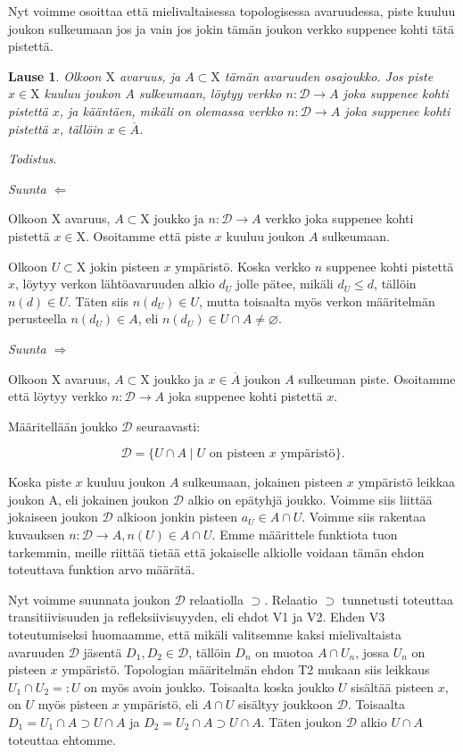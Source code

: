 \documentclass[12pt,a4paper,leqno]{report}
\newcommand{\X}{\mathrm{X}}
\newcommand{\D}{\mathcal{D}}
\newcommand{\verkop}{\leq}
\theoremstyle{plain}
\newtheorem{lause}[equation]{Lause}
\theoremstyle{definition}
\theoremstyle{remark}
\begin{document}
Nyt voimme osoittaa että mielivaltaisessa topologisessa avaruudessa, piste kuuluu joukon sulkeumaan jos ja vain jos jokin tämän joukon verkko suppenee kohti tätä pistettä.

\begin{lause}\label{verksulklause}
Olkoon $\X$ avaruus, ja $A \subset \X$ tämän avaruuden osajoukko. Jos piste $x \in \X$ kuuluu joukon $A$ sulkeumaan, löytyy verkko $n : \D \to A$ joka suppenee kohti pistettä $x$, ja kääntäen, mikäli on olemassa verkko $n : \D \to A$ joka suppenee kohti pistettä $x$, tällöin $x \in \overline{A}$.
\end{lause}

\noindent\emph{Todistus}.

\emph{Suunta $\Leftarrow$}

Olkoon $\X$ avaruus, $A \subset \X$ joukko ja $n : \D \to A$ verkko joka suppenee kohti pistettä $x \in \X$. Osoitamme että piste $x$ kuuluu joukon $A$ sulkeumaan.

Olkoon $U \subset \X$ jokin pisteen $x$ ympäristö. Koska verkko $n$ suppenee kohti pistettä $x$, löytyy verkon lähtöavaruuden alkio $d_U$ jolle pätee, mikäli $d_U \verkop d$, tällöin $n(d) \in U$. Täten siis $n(d_U) \in U$, mutta toisaalta myös verkon määritelmän perusteella $n(d_U) \in A$, eli $n(d_U) \in U \cap A \not= \varnothing$.

\emph{Suunta $\Rightarrow$}

Olkoon $\X$ avaruus, $A \subset \X$ joukko ja $x \in \overline{A}$ joukon $A$ sulkeuman piste. Osoitamme että löytyy verkko $n : \D \to A$ joka suppenee kohti pistettä $x$.

Määritellään joukko $\D$ seuraavasti:

\begin{equation}
\D = \{U \cap A \mid U \text{ on pisteen }x\text{ ympäristö}\}\text{.}
\end{equation}

Koska piste $x$ kuuluu joukon $A$ sulkeumaan, jokainen pisteen $x$ ympäristö leikkaa joukon A, eli jokainen joukon $\D$ alkio on epätyhjä joukko. Voimme siis liittää jokaiseen joukon $\D$ alkioon jonkin pisteen $a_U \in A \cap U$. Voimme siis rakentaa kuvauksen $n : \D \to A, n(U) \in A \cap U$. Emme määrittele funktiota tuon tarkemmin, meille riittää tietää että jokaiselle alkiolle voidaan tämän ehdon toteuttava funktion arvo määrätä.

Nyt voimme suunnata joukon $\D$ relaatiolla $\supset$. Relaatio $\supset$ tunnetusti toteuttaa transitiivisuuden ja refleksiivisuyyden, eli ehdot V1 ja V2. Ehden V3 toteutumiseksi huomaamme, että mikäli valitsemme kaksi mielivaltaista avaruuden $\D$ jäsentä $D_1, D_2 \in \D$, tällöin $D_n$ on muotoa $A \cap U_n$, jossa $U_n$ on pisteen $x$ ympäristö. Topologian määritelmän ehdon T2 mukaan siis leikkaus $U_1 \cap U_2 =: U$ on myös avoin joukko. Toisaalta koska joukko $U$ sisältää pisteen $x$, on $U$ myös pisteen $x$ ympäristö, eli $A \cap U$ sisältyy joukkoon $\D$. Toisaalta $D_1 = U_1 \cap A \supset U \cap A$ ja $D_2 = U_2 \cap A \supset U \cap A$. Täten joukon $\D$ alkio $U \cap A$ toteuttaa ehtomme.
\end{document}
